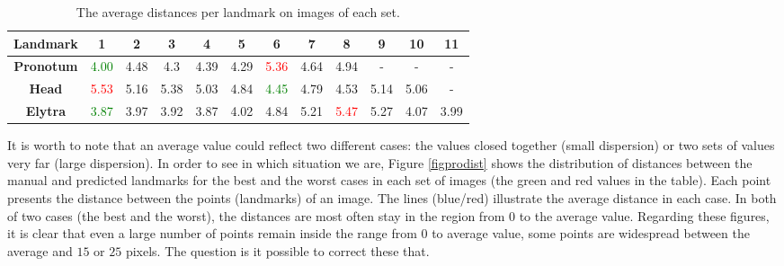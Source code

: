 \documentclass[review]{elsarticle}
\begin{document}
\begin{table}[h!]
	\centering	
	\begin{tabular}{|c|c|c|c|c|c|c|c|c|c|c|c|}
		\hline
		\textbf{Landmark} & 1 & 2 & 3 & 4 & 5 & 6 & 7 & 8 & 9 & 10 & 11 \\ \hline
		\textbf{Pronotum} & \textcolor{green}{4.00} & 4.48 & 4.3 & 4.39 & 4.29 & \textcolor{red}{5.36} & 4.64 & 4.94 & - & - & - \\ \hline
		\textbf{Head} & \textcolor{red}{5.53} & 5.16 & 5.38 & 5.03 & 4.84 & \textcolor{green}{4.45} & 4.79 & 4.53 & 5.14 & 5.06 & - \\ \hline
		\textbf{Elytra} & \textcolor{green}{3.87} & 3.97 & 3.92 & 3.87 & 4.02 & 4.84 & 5.21 & \textcolor{red}{5.47} & 5.27 & 4.07 & 3.99 \\ \hline
	\end{tabular}
	\caption{The average distances per landmark on images of each set.}
	\label{tblavgpronotum}
\end{table}

It is worth to note that an average value could reflect two different cases: the values closed together (small dispersion) or two sets of values very far (large dispersion). In order to see in which situation we are, Figure \ref{figprodist} shows the distribution of distances between the manual and predicted landmarks for the best and the worst cases in each set of images (the green and red values in the table). Each point presents the distance between the points (landmarks) of an image. The lines (blue/red) illustrate the average distance in each case. In both of two cases (the best and the worst), the distances are most often stay in the region from 0 to the average value. Regarding these figures, it is clear that even a large number of points remain inside the range from $0$ to average value, some points are widespread between the average and $15$ or $25$ pixels. The question is it possible to correct these that. %
\end{document}
